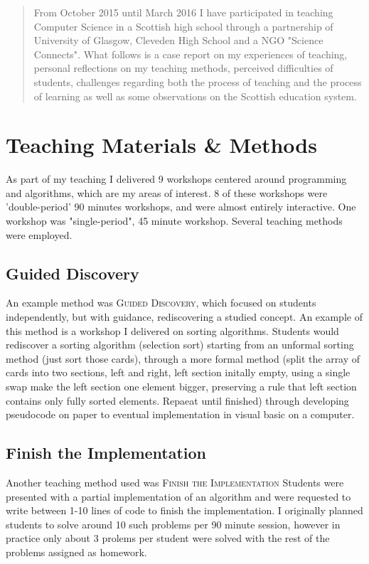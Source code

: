 \documentclass[12pt]{article}
\begin{document}
\maketitle

\begin{abstract}
From October 2015 until March 2016 I have participated in teaching Computer Science in a Scottish high school through a partnership of University of Glasgow, Cleveden High School and a NGO "Science Connects". What follows is a case report on my experiences of teaching, personal reflections on my teaching methods, perceived difficulties of students, challenges regarding both the process of teaching and the process of learning as well as some observations on the Scottish education system. 
\end{abstract}

\section{Teaching Materials \& Methods}
As part of my teaching I delivered 9 workshops centered around programming and algorithms, which are my areas of interest. 8 of these workshops were 'double-period' 90 minutes workshops, and were almost entirely interactive. One workshop was "single-period", 45 minute workshop. Several teaching methods were employed.

\subsection{Guided Discovery}
An example method was \textsc{Guided Discovery}, which focused on students independently, but with guidance, rediscovering a studied concept. An example of this method is a workshop I delivered on sorting algorithms. Students would rediscover a sorting algorithm (selection sort) starting from an unformal sorting method (just sort those cards), through a more formal method (split the array of cards into two sections, left and right, left section initally empty, using a single swap make the left section one element bigger, preserving a rule that left section contains only fully sorted elements. Repaeat until finished) through developing pseudocode on paper to eventual implementation in visual basic on a computer.

\subsection{Finish the Implementation}
Another teaching method used was \textsc{Finish the Implementation} Students were presented with a partial implementation of an algorithm and were requested to write between 1-10 lines of code to finish the implementation. I originally planned students to solve around 10 such problems per 90 minute session, however in practice only about 3 prolems per student were solved with the rest of the problems assigned as homework.
\end{document}

